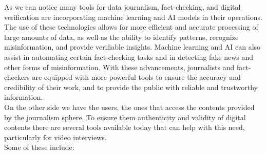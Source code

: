 \documentclass[target=mst,aauheader=]{thud}
\begin{document}
As we can notice many tools for data journalism, fact-checking, and digital verification are incorporating machine learning and AI models in their operations. The use of these technologies allows for more efficient and accurate processing of large amounts of data, as well as the ability to identify patterns, recognize misinformation, and provide verifiable insights. Machine learning and AI can also assist in automating certain fact-checking tasks and in detecting fake news and other forms of misinformation. With these advancements, journalists and fact-checkers are equipped with more powerful tools to ensure the accuracy and credibility of their work, and to provide the public with reliable and trustworthy information.\\

On the other side we have the users, the ones that access the contents provided by the journalism sphere. To ensure them authenticity and validity of digital contents there are several tools available today that can help with this need, particularly for video interviews.\\
Some of these include:
\end{document}
